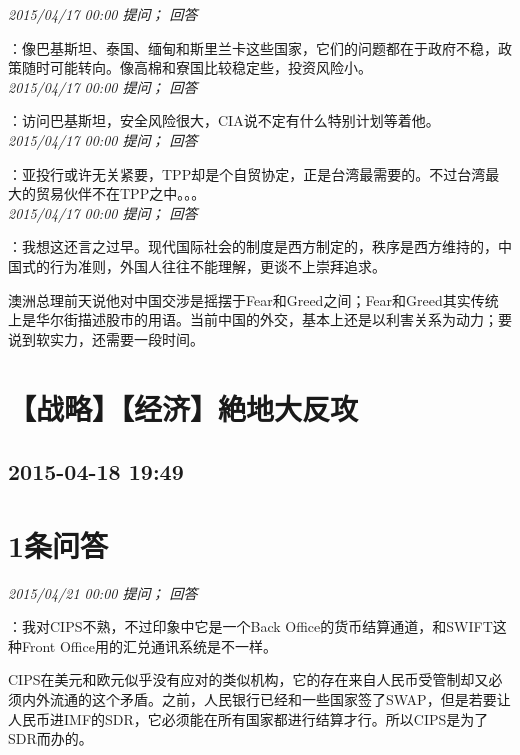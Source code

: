 \documentclass[twocolumn]{ctexart}
\begin{document}
\textit{\hfill\noindent\small 2015/04/17 00:00 提问； 回答}

：像巴基斯坦、泰国、缅甸和斯里兰卡这些国家，它们的问题都在于政府不稳，政策随时可能转向。像高棉和寮国比较稳定些，投资风险小。\\

\textit{\hfill\noindent\small 2015/04/17 00:00 提问； 回答}

：访问巴基斯坦，安全风险很大，CIA说不定有什么特别计划等着他。\\

\textit{\hfill\noindent\small 2015/04/17 00:00 提问； 回答}

：亚投行或许无关紧要，TPP却是个自贸协定，正是台湾最需要的。不过台湾最大的贸易伙伴不在TPP之中。。。\\

\textit{\hfill\noindent\small 2015/04/17 00:00 提问； 回答}

：我想这还言之过早。现代国际社会的制度是西方制定的，秩序是西方维持的，中国式的行为准则，外国人往往不能理解，更谈不上崇拜追求。

澳洲总理前天说他对中国交涉是摇摆于Fear和Greed之间；Fear和Greed其实传统上是华尔街描述股市的用语。当前中国的外交，基本上还是以利害关系为动力；要说到软实力，还需要一段时间。\\


\section{【战略】【经济】絶地大反攻}
\subsection{2015-04-18 19:49}


\section{1条问答}

\textit{\hfill\noindent\small 2015/04/21 00:00 提问； 回答}

：我对CIPS不熟，不过印象中它是一个Back Office的货币结算通道，和SWIFT这种Front Office用的汇兑通讯系统是不一样。

CIPS在美元和欧元似乎没有应对的类似机构，它的存在来自人民币受管制却又必须内外流通的这个矛盾。之前，人民银行已经和一些国家签了SWAP，但是若要让人民币进IMF的SDR，它必须能在所有国家都进行结算才行。所以CIPS是为了SDR而办的。
\end{document}
